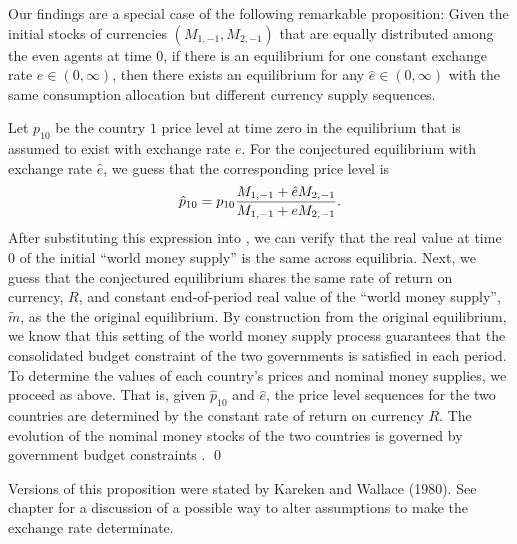  Our findings are a special case of the following remarkable
proposition:
\medskip
{} Given the initial stocks of
currencies $(M_{1,-1},M_{2,-1})$ that are equally distributed among
the even agents at time $0$, if there is an equilibrium
for one constant exchange rate $e \in (0,\infty)$, then there exists
an equilibrium for any $\hat e \in (0,\infty)$
with the same consumption allocation but different currency supply sequences.

\medskip

 Let $p_{10}$ be the country $1$ price level at
time zero in the equilibrium that is assumed to exist with exchange
rate $e$.
For the conjectured equilibrium with exchange rate $\hat e$, we guess
that the corresponding price level is
$$
\hat p_{10} = p_{10}
     {M_{1,-1} + \hat e M_{2,-1} \over M_{1,-1} + e M_{2,-1}}.
$$
After substituting this expression into , we can verify
that the real value at time $0$ of the initial ``world money supply'' is
the same across equilibria. Next, we guess that the conjectured equilibrium
shares the same rate of return on currency, $R$, and constant
end-of-period real value of the ``world money supply'', $\tilde m$, as the
the original equilibrium. By construction from the original equilibrium,
we know that this setting of the world money supply process guarantees
that the consolidated budget constraint of the two governments is satisfied
in each period. To determine the values of each country's
prices and nominal money supplies, we proceed as above.
That is, given $\hat p_{10}$ and $\hat e$,
the price level sequences  for the two countries are determined
by the constant rate of return on currency $R$.
The evolution of the nominal money stocks
of the two countries is governed by government budget constraints
. \qed

\medskip
 Versions of  this proposition were
stated by Kareken and Wallace (1980).
See chapter  for a discussion of a possible way to
alter assumptions to make the exchange rate  determinate.

%
 
